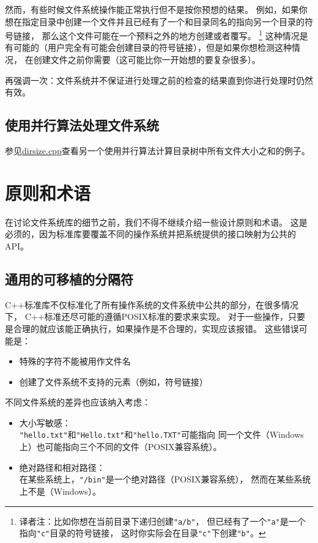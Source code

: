 然而，有些时候文件系统操作能正常执行但不是按你预想的结果。
例如，如果你想在指定目录中创建一个文件并且已经有了一个和目录同名的指向另一个目录的符号链接，
那么这个文件可能在一个预料之外的地方创建或者覆写。
\footnote{译者注：比如你想在当前目录下递归创建\texttt{"a/b"}，
但已经有了一个\texttt{"a"}是一个指向\texttt{"c"}目录的符号链接，
这时你实际会在目录\texttt{"c"}下创建\texttt{"b"}。}
这种情况是有可能的（用户完全有可能会创建目录的符号链接），但是如果你想检测这种情况，
在创建文件之前你需要（这可能比你一开始想的要复杂很多）。

再强调一次：文件系统并不保证进行处理之前的检查的结果直到你进行处理时仍然有效。

\subsection{使用并行算法处理文件系统}
参见\hyperref[ch22.6.1.4]{dirsize.cpp}查看另一个使用并行算法计算目录树中所有文件大小之和的例子。


\section{原则和术语}
在讨论文件系统库的细节之前，我们不得不继续介绍一些设计原则和术语。
这是必须的，因为标准库要覆盖不同的操作系统并把系统提供的接口映射为公共的API。

\subsection{通用的可移植的分隔符}
C++标准库不仅标准化了所有操作系统的文件系统中公共的部分，在很多情况下，
C++标准还尽可能的遵循POSIX标准的要求来实现。
对于一些操作，只要是合理的就应该能正确执行，如果操作是不合理的，实现应该报错。
这些错误可能是：
\begin{itemize}
    \item 特殊的字符不能被用作文件名
    \item 创建了文件系统不支持的元素（例如，符号链接）
\end{itemize}
不同文件系统的差异也应该纳入考虑：
\begin{itemize}
    \item 大小写敏感：\\
    \texttt{"hello.txt"}和\texttt{"Hello.txt"}和\texttt{"hello.TXT"}可能指向
    同一个文件（Windows上）也可能指向三个不同的文件（POSIX兼容系统）。
    \item 绝对路径和相对路径：\\
    在某些系统上，\texttt{"/bin"}是一个绝对路径（POSIX兼容系统），
    然而在某些系统上不是（Windows）。
\end{itemize}

